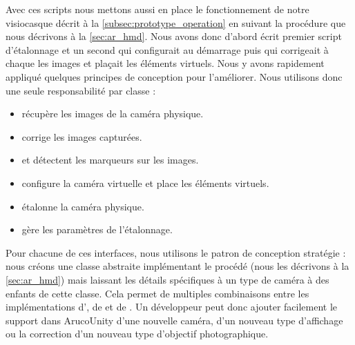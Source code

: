Avec ces scripts nous mettons aussi en place le fonctionnement de notre visiocasque décrit à la \autoref{subsec:prototype_operation} en suivant la procédure que nous décrivons à la \autoref{sec:ar_hmd}. Nous avons donc d'abord écrit premier script d'étalonnage et un second qui configurait au démarrage puis qui corrigeait à chaque  les images et plaçait les éléments virtuels. Nous y avons rapidement appliqué quelques principes de conception pour l'améliorer. Nous utilisons donc une seule responsabilité par classe  :
\begin{itemize}
  \item {} récupère les images de la caméra physique.
  \item {} corrige les images capturées.
  \item {} et  détectent les marqueurs sur les images.
  \item {} configure la caméra virtuelle et place les éléments virtuels.
  \item {} étalonne la caméra physique.
  \item {} gère les paramètres de l'étalonnage.
\end{itemize}
\medskip

Pour chacune de ces interfaces, nous utilisons le patron de conception stratégie : nous créons une classe abstraite implémentant le procédé (nous les décrivons à la \autoref{sec:ar_hmd}) mais laissant les détails spécifiques à un type de caméra à des enfants de cette classe. Cela permet de multiples combinaisons entre les implémentations d', de  et de . Un développeur peut donc ajouter facilement le support dans ArucoUnity d'une nouvelle caméra, d'un nouveau type d'affichage ou la correction d'un nouveau type d'objectif photographique.

